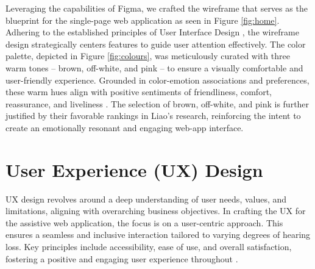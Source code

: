 \documentclass{l4proj}
\begin{document}
Leveraging the capabilities of Figma, we crafted the wireframe that serves as the blueprint for the single-page web application as seen in Figure \ref{fig:home}. Adhering to the established principles of User Interface Design \citep{Usability.gov_2014}, the wireframe design strategically centers features to guide user attention effectively. The color palette, depicted in Figure \ref{fig:colours}, was meticulously curated with three warm tones – brown, off-white, and pink – to ensure a visually comfortable and user-friendly experience. Grounded in color-emotion associations and preferences, these warm hues align with positive sentiments of friendliness, comfort, reassurance, and liveliness \citep{UIcolor}. The selection of brown, off-white, and pink is further justified by their favorable rankings in Liao's research, reinforcing the intent to create an emotionally resonant and engaging web-app interface.

\section{User Experience (UX) Design}
\label{sec:UX}

UX design revolves around a deep understanding of user needs, values, and limitations, aligning with overarching business objectives. In crafting the UX for the assistive web application, the focus is on a user-centric approach. This ensures a seamless and inclusive interaction tailored to varying degrees of hearing loss. Key principles include accessibility, ease of use, and overall satisfaction, fostering a positive and engaging user experience throughout \citep{usabilityUX}.
\end{document}
